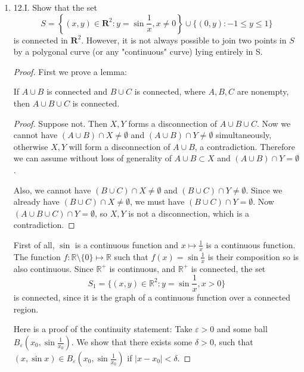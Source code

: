 \begin{enumerate}
\begin{proof}
	Without loss of generality, assume $A \cap C = \emptyset $. Then $C \subset B$ since $C \subset A \cup B$. But $A \cap \overline{C} \neq \emptyset $, so there exists $x \in A \cap \overline{C} $ such that $x \in A $ is a cluster point of $C$. However, since $A$ is open, there exists a neighborhood $N$ such that $x \in N \subset A$. Thus $N \cap C = \emptyset $, so $x$ is not a cluster point of $C$, a contradiction.
\end{proof}

\item 12.I. Show that the set
\[
S=\left\{(x, y) \in \mathbf{R}^2: y=\sin \frac{1}{x}, x \neq 0\right\} \cup\{(0, y):-1 \leq y \leq 1\}
\]
is connected in $\boldsymbol{R}^2$. However, it is not always possible to join two points in $S$ by a polygonal curve (or any "continuous" curve) lying entirely in S.
\begin{proof}
	First we prove a lemma:
\begin{lemma}
	If $A \cup B$ is connected and $B \cup C$ is connected, where $A, B, C$ are nonempty, then $A \cup B \cup C$ is connected.

\begin{proof}
	Suppose not. Then $X,Y$ forms a disconnection of $A \cup B \cup C$. Now we cannot have  $(A \cup B)\cap X\neq \emptyset $ and $(A \cup B) \cap Y \neq \emptyset $ simultaneously, otherwise $X,Y$ will form a disconnection of $A \cup B$, a contradiction. Therefore we can assume without loss of generality of $A \cup B \subset X$ and $(A \cup B) \cap Y = \emptyset $.

	Also, we cannot have $(B \cup C) \cap X \neq \emptyset $ and $(B \cup C) \cap Y \neq \emptyset $. Since we already have $(B \cup C) \cap X \neq \emptyset $, we must have $(B \cup C) \cap Y = \emptyset $. Now $(A \cup B \cup C) \cap Y = \emptyset $, so $X,Y  $ is not a disconnection, which is a contradiction.
\end{proof}
\end{lemma}
	First of all,  $\sin$ is a continuous function and $x \mapsto \frac{1}{x}$ is a continuous function. The function $f: \mathbb{R}\setminus \{0\}  \mapsto \mathbb{R}$ such that $f(x) = \sin \frac{1}{x}$ is their composition so is also continuous. Since $\mathbb{R}^+$ is continuous, and $\mathbb{R}^+$ is connected, the set \[
		S_1 = \{(x,y) \in \mathbb{R}^2: y = \sin \frac{1}{x}, x > 0\} 
	\] 
	is connected, since it is the graph of a continuous function over a connected region.

	Here is a proof of the continuity statement: Take $\varepsilon>0$ and some ball $B_\varepsilon(x_0, \sin \frac{1}{x_0})$. We show that there exists some $\delta>0$, such that $(x, \sin x) \in B_\varepsilon(x_0, \sin\frac{1}{x_0})$ if $|x-x_0|<\delta$. 



\end{proof}
\end{enumerate}
